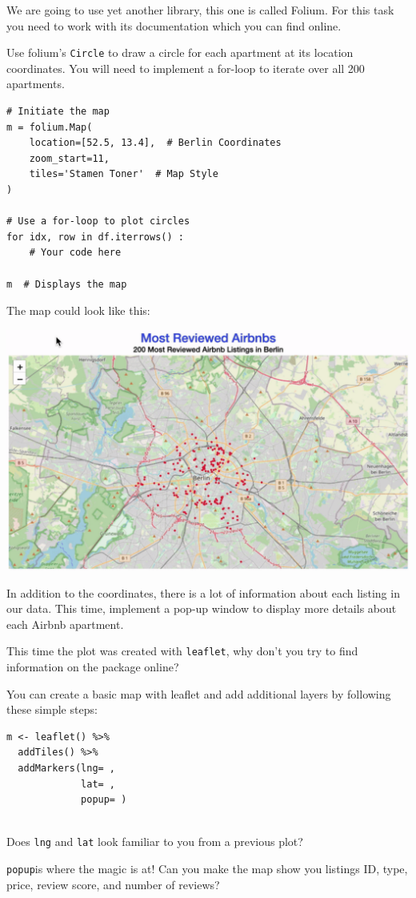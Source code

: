 \documentclass[
  11pt,
]{article}
\newenvironment{tips}[1]
  {
  \begin{itemize}
  \footnotesize
  \renewcommand{\labelitemi}{
    \raisebox{-.7\height}[0pt][0pt]{
      {\setkeys{Gin}{width=3em,keepaspectratio}
        \texttt{[image: images/\#1.png]}}
    }
  }
  \setlength{\fboxsep}{1em}
  \begin{rbox}
  \item
  }
  {
  \end{rbox}
  \end{itemize}
  }
\newenvironment{tipsp}[1]
  {
  \begin{itemize}
  \footnotesize
  \renewcommand{\labelitemi}{
    \raisebox{-.7\height}[0pt][0pt]{
      {\setkeys{Gin}{width=3em,keepaspectratio}
        \texttt{[image: images/\#1.png]}}
    }
  }
  \setlength{\fboxsep}{1em}
  \begin{pbox}
  \item
  }
  {
  \end{pbox}
  \end{itemize}
  }
\begin{document}
\begin{tipsp}p

We are going to use yet another library, this one is called Folium. For this task you need to work with its documentation which you can find online.

Use folium's \texttt{Circle} to draw a circle for each apartment at its location coordinates. You will need to implement a for-loop to iterate over all 200 apartments.

\begin{verbatim}
# Initiate the map
m = folium.Map(
    location=[52.5, 13.4],  # Berlin Coordinates
    zoom_start=11,
    tiles='Stamen Toner'  # Map Style
)

# Use a for-loop to plot circles
for idx, row in df.iterrows() :
    # Your code here

m  # Displays the map
\end{verbatim}


\end{tipsp}

The map could look like this:

\begin{center}\includegraphics[width=1\linewidth]{plot/01_python/map_circles} \end{center}

In addition to the coordinates, there is a lot of information about each listing in our data. This time, implement a pop-up window to display more details about each Airbnb apartment.

\begin{tips}r
This time the plot was created with \texttt{leaflet}, why don't you try to find information on the package online?

You can create a basic map with leaflet and add additional layers by following these simple steps:

\begin{verbatim}
m <- leaflet() %>%
  addTiles() %>% 
  addMarkers(lng= , 
             lat= , 
             popup= )
           
\end{verbatim}

Does \texttt{lng} and \texttt{lat} look familiar to you from a previous plot?

\texttt{popup}is where the magic is at! Can you make the map show you listings ID, type, price, review score, and number of reviews?

\end{tips}
\end{document}
